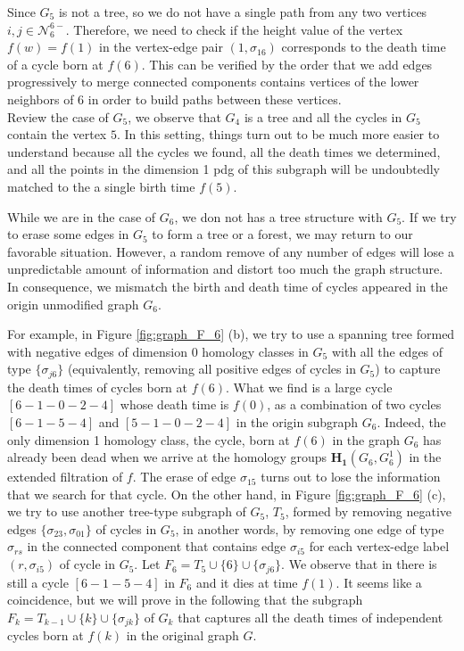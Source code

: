 \documentclass[a4paper,12pt]{article}
\numberwithin{equation}{section}
\begin{document}
	Since $G_5$ is not a tree, so we do not have a single path from any two vertices $i,j \in \mathcal{N}_6^{6-}$. Therefore, we need to check if the height value of the vertex $f(w) = f(1)$ in the vertex-edge pair $(1,\sigma_{16})$ corresponds to the death time of a cycle born at $f(6)$. This can be verified by the order that we add edges progressively to merge connected components contains vertices of the lower neighbors of $6$ in order to build paths between these vertices.\\
	
	Review the case of $G_5$, we observe that $G_4$ is a tree and all the cycles in $G_5$ contain the vertex $5$. In this setting, things turn out to be much more easier to understand because all the cycles we found, all the death times we determined, and all the points in the dimension 1 pdg of this subgraph will be undoubtedly matched to the a single birth time $f(5)$.
	
	While we are in the case of $G_6$, we don not has a tree structure with $G_5$. If we try to erase some edges in $G_5$ to form a tree or a forest, we may return to our favorable situation. However, a random remove of any number of edges will lose a unpredictable amount of information and distort too much the graph structure. In consequence, we mismatch the birth and death time of cycles appeared in the origin unmodified graph $G_6$.
	
	For example, in Figure \ref{fig:graph_F_6} (b), we try to use a spanning tree formed with negative edges of dimension 0 homology classes in $G_5$ with all the edges of type $\{\sigma_{j6}\}$ (equivalently, removing all positive edges of cycles in $G_5$) to capture the death times of cycles born at $f(6)$. What we find is a large cycle $[6-1-0-2-4]$ whose death time is $f(0)$, as a combination of two cycles $[6-1-5-4]$ and $[5-1-0-2-4]$ in the origin subgraph $G_6$. Indeed, the only dimension 1 homology class, the cycle, born at $f(6)$ in the graph $G_6$ has already been dead when we arrive at the homology groups $\mathbf{H_1}(G_6, G_6^1)$ in the extended filtration of $f$. The erase of edge $\sigma_{15}$ turns out to lose the information that we search for that cycle. On the other hand, in Figure \ref{fig:graph_F_6} (c), we try to use another tree-type subgraph of $G_5$, $T_5$, formed by removing negative edges $\{\sigma_{23}, \sigma_{01} \}$ of cycles in $G_5$, in another words, by removing one edge of type $\sigma_{rs}$ in the connected component that contains edge $\sigma_{i5}$ for each vertex-edge label $(r,\sigma_{i5})$  of cycle in $G_5$. Let $F_6 = T_5 \cup \{6\} \cup \{\sigma_{j6} \}$. We observe that in there is still a cycle $[6-1-5-4]$ in $F_6$ and it dies at time $f(1)$. It seems like a coincidence, but we will prove in the following that the subgraph $F_{k} = T_{k-1} \cup \{k \} \cup \{ \sigma_{jk} \}$ of $G_k$ that captures all the death times of independent cycles born at $f(k)$ in the original graph $G$.\\
	
\end{document}
